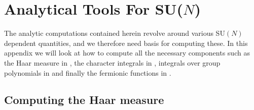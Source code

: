 \chapter{Analytical Tools For SU(\texorpdfstring{$N$}{N})} \label{apxA}

The analytic computations contained herein revolve around various SU$(N)$
dependent quantities, and we therefore need basis for computing these. In this
appendix we will look at how to compute all the necessary components such as the
Haar measure in , the character integrals in
, integrals over group polynomials in
 and finally the fermionic functions in
.

\section{Computing the Haar measure} \label{sec:haar_measure}

